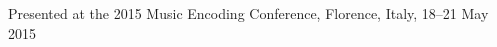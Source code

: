 \documentclass[final]{beamer}
\begin{document}
\begin{frame}[fragile,t]
\begin{minipage}[t][.8\textheight]{\textwidth}
\begin{columns}
\begin{column}{0.95\textwidth}
    \end{column}

\begin{column}{0.00\textwidth}
\end{column}
\end{columns}
\begin{center}
    \footnotesize
    Presented at the 2015 Music Encoding Conference, Florence, Italy, 18--21 May 2015
\end{center}
\end{minipage}
\end{frame}
\end{document}
